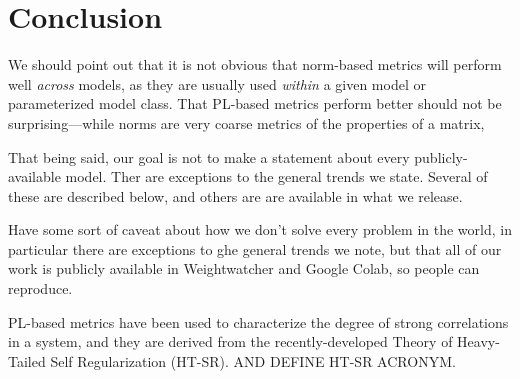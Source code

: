 \section{Conclusion}
\label{sxn:conc}



We should point out that it is not obvious that norm-based metrics will perform well \emph{across} models, as they are usually used \emph{within} a given model or parameterized model class.
That PL-based metrics perform better should not be surprising---while norms are very coarse metrics of the properties of a matrix, 

That being said, our goal is not to make a statement about every publicly-available model.
Ther are exceptions to the general trends we state.
Several of these are described below, and others are are available in what we release.

Have some sort of caveat about how we don't solve every problem in the world, in particular there are exceptions to ghe general trends we note, but that all of our work is publicly available in Weightwatcher and Google Colab, so people can reproduce.

PL-based metrics have been used to characterize the degree of strong correlations in a system, and they are derived from the recently-developed Theory of Heavy-Tailed Self Regularization (HT-SR).
AND DEFINE HT-SR ACRONYM.






